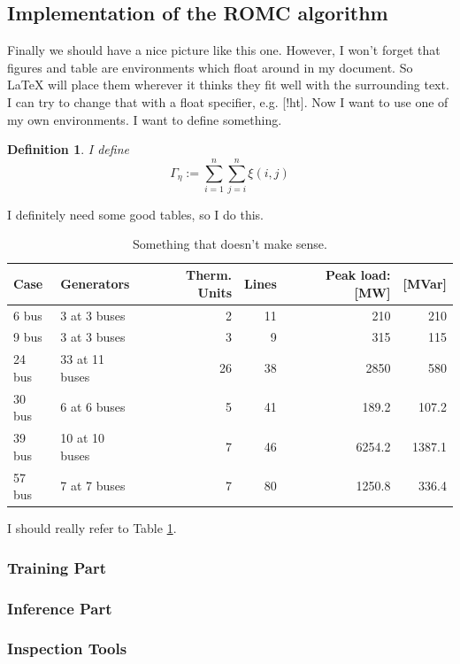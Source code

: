 \documentclass[11pt,twoside]{article}
\newtheorem{Definition}{Definition}
\numberwithin{Theorem}{section}
\numberwithin{Definition}{section}
\numberwithin{Lemma}{section}
\numberwithin{Algorithm}{section}
\numberwithin{equation}{section}
\begin{document}
\subsection{Implementation of the ROMC algorithm}
Finally we should have a nice picture like this one. However, I won't forget that figures and table are environments which float around in my document. So LaTeX will place them wherever it thinks they fit well with the surrounding text. I can try to change that with a float specifier, e.g. [!ht].
Now I want to use one of my own environments. I want to define something.
\begin{Definition}
 I define
$$
\Gamma_{\eta}:=\sum_{i=1}^{n}\sum_{j=i}^{n}\xi{}(i,j)
$$
\end{Definition}
I definitely need some good tables, so I do this.
\begin{table}[!ht]
\centering
\begin{tabular}{|ll|rrrr|}
\hline
Case&Generators&Therm. Units&Lines&Peak load: [MW]&[MVar]\\
\hline\hline
6 bus&3 at 3 buses&2&11&210&210\\
9 bus&3 at 3 buses&3&9&315&115\\
24 bus&33 at 11 buses&26&38&2850&580\\
30 bus&6 at 6 buses&5&41&189.2&107.2\\
39 bus&10 at 10 buses&7&46&6254.2&1387.1\\
57 bus&7 at 7 buses&7&80&1250.8&336.4\\
\hline
\end{tabular}
\caption{Something that doesn't make sense.}
\label{tab:things}
\end{table}
I should really refer to Table \ref{tab:things}.

\subsubsection{Training Part}

\subsubsection{Inference Part}

\subsubsection{Inspection Tools}
\end{document}
